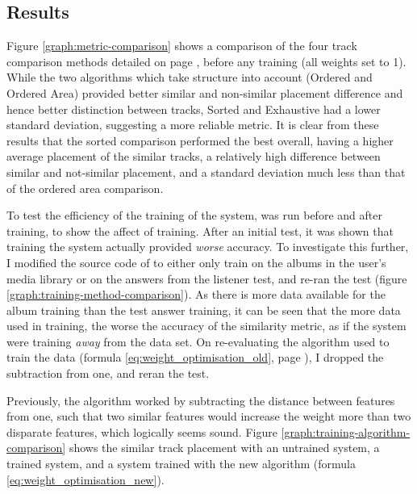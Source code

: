 \subsection{Results}
Figure \ref{graph:metric-comparison} shows a comparison of the four track comparison methods detailed on page \pageref{text:method:comparison_methods}, before any training (all weights set to 1). While the two algorithms which take structure into account (Ordered and Ordered Area) provided better similar and non-similar placement difference and hence better distinction between tracks, Sorted and Exhaustive had a lower standard deviation, suggesting a more reliable metric. It is clear from these results that the sorted comparison performed the best overall, having a higher average placement of the similar tracks, a relatively high difference between similar and not-similar placement, and a standard deviation much less than that of the ordered area comparison.

To test the efficiency of the training of the system,  was run before and after training, to show the affect of training. After an initial test, it was shown that training the system actually provided \emph{worse} accuracy.  To investigate this further, I modified the source code of  to either only train on the albums in the user's media library or on the answers from the listener test, and re-ran the test (figure \ref{graph:training-method-comparison}). As there is more data available for the album training than the test answer training, it can be seen that the more data used in training, the worse the accuracy of the similarity metric, as if the system were training \emph{away} from the data set. On re-evaluating the algorithm used to train the data (formula \ref{eq:weight_optimisation_old}, page \pageref{eq:weight_optimisation_old}), I dropped the subtraction from one, and reran the test. 

Previously, the algorithm worked by subtracting the distance between features from one, such that two similar features would increase the weight more than two disparate features, which logically seems sound. Figure \ref{graph:training-algorithm-comparison} shows the similar track placement with an untrained system, a trained system, and a system trained with the new algorithm (formula \ref{eq:weight_optimisation_new}).


